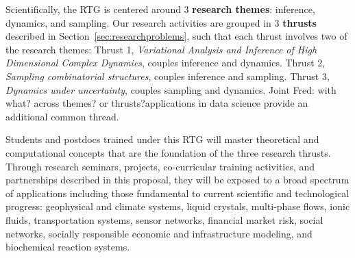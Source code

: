 \documentclass[11pt]{NSFamsart}
\newcommand{\FredNote}[1]{{\color{blue} Fred: #1}}
\begin{document}
Scientifically, the RTG is centered around 3 {\bf research themes}: inference, dynamics, and sampling. Our research activities are grouped in 3 {\bf thrusts} described in Section~\ref{sec:researchproblems}, such that each thrust involves two of the research themes: 
Thrust 1, \emph{Variational Analysis and Inference of High Dimensional Complex Dynamics}, couples inference and dynamics. 
Thrust 2, \emph{Sampling combinatorial structures}, couples inference and sampling. 
Thrust 3, \emph{Dynamics under uncertainty}, couples sampling and dynamics. 
Joint \FredNote{with what? across themes? or thrusts?}applications in data science provide an additional common thread.  %



Students and postdocs trained under this RTG will master theoretical and computational concepts that are the foundation of the three research thrusts. Through research seminars, projects, co-curricular training activities, and partnerships described in this proposal, they will be exposed to a broad spectrum of applications including  those fundamental to current scientific and technological progress: geophysical and climate systems, liquid crystals, multi-phase flows, ionic fluids,  transportation systems, sensor networks, financial market risk, social networks, socially responsible economic and infrastructure modeling, and biochemical reaction systems.
\end{document}

